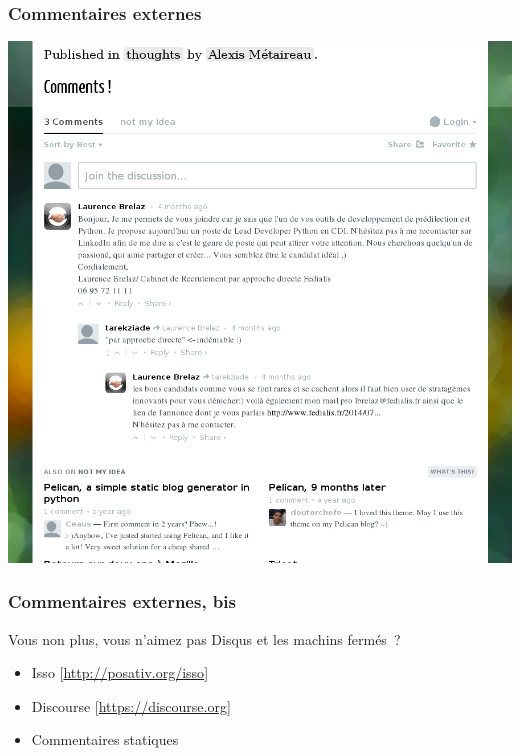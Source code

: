 \documentclass[frenchb,francais]{beamer}
\begin{document}
\begin{frame}
    \frametitle{Commentaires externes}
    \begin{center}\includegraphics[scale=.20]{img/disqus.png}\end{center}
\end{frame}

\begin{frame}
    \frametitle{Commentaires externes, bis}
    Vous non plus, vous n’aimez pas Disqus et les machins fermés ?
    \begin{itemize}
        \item Isso [\url{http://posativ.org/isso}]
        \item Discourse [\url{https://discourse.org}]
        \item Commentaires statiques
    \end{itemize}
\end{frame}
\end{document}
